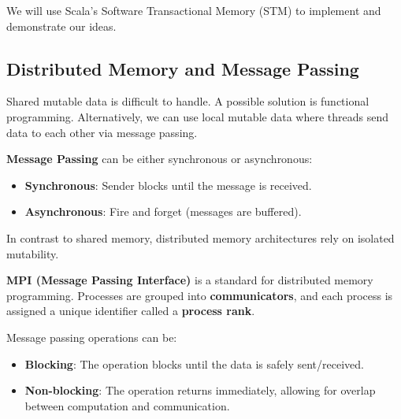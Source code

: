 \begin{remark}
    We will use Scala's Software Transactional Memory (STM) to implement and demonstrate our ideas.
\end{remark}


\subsection{Distributed Memory and Message Passing}

\begin{remark}
    Shared mutable data is difficult to handle. A possible solution is functional programming. Alternatively, we can use local mutable data where threads send data to each other via message passing.
\end{remark}

\begin{definition}
    \textbf{Message Passing} can be either synchronous or asynchronous:
    \begin{itemize}
        \item \textbf{Synchronous}: Sender blocks until the message is received.
        \item \textbf{Asynchronous}: Fire and forget (messages are buffered).
    \end{itemize}
\end{definition}

\begin{remark}
    In contrast to shared memory, distributed memory architectures rely on isolated mutability.
\end{remark}

\begin{definition}
    \textbf{MPI (Message Passing Interface)} is a standard for distributed memory programming. Processes are grouped into \textbf{communicators}, and each process is assigned a unique identifier called a \textbf{process rank}.
\end{definition}

\begin{definition}
    Message passing operations can be:
    \begin{itemize}
        \item \textbf{Blocking}: The operation blocks until the data is safely sent/received.
        \item \textbf{Non-blocking}: The operation returns immediately, allowing for overlap between computation and communication.
    \end{itemize}
\end{definition}

